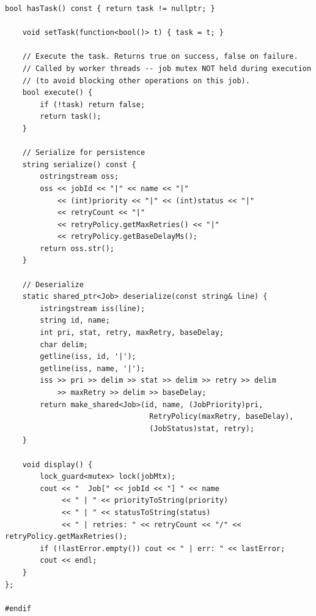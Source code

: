 \documentclass[11pt,a4paper]{article}
\begin{document}
\begin{lstlisting}[title={\texttt{models.hpp}}]
    bool hasTask() const { return task != nullptr; }

    void setTask(function<bool()> t) { task = t; }

    // Execute the task. Returns true on success, false on failure.
    // Called by worker threads -- job mutex NOT held during execution
    // (to avoid blocking other operations on this job).
    bool execute() {
        if (!task) return false;
        return task();
    }

    // Serialize for persistence
    string serialize() const {
        ostringstream oss;
        oss << jobId << "|" << name << "|"
            << (int)priority << "|" << (int)status << "|"
            << retryCount << "|"
            << retryPolicy.getMaxRetries() << "|"
            << retryPolicy.getBaseDelayMs();
        return oss.str();
    }

    // Deserialize
    static shared_ptr<Job> deserialize(const string& line) {
        istringstream iss(line);
        string id, name;
        int pri, stat, retry, maxRetry, baseDelay;
        char delim;
        getline(iss, id, '|');
        getline(iss, name, '|');
        iss >> pri >> delim >> stat >> delim >> retry >> delim
            >> maxRetry >> delim >> baseDelay;
        return make_shared<Job>(id, name, (JobPriority)pri,
                                 RetryPolicy(maxRetry, baseDelay),
                                 (JobStatus)stat, retry);
    }

    void display() {
        lock_guard<mutex> lock(jobMtx);
        cout << "  Job[" << jobId << "] " << name
             << " | " << priorityToString(priority)
             << " | " << statusToString(status)
             << " | retries: " << retryCount << "/" << retryPolicy.getMaxRetries();
        if (!lastError.empty()) cout << " | err: " << lastError;
        cout << endl;
    }
};

#endif
\end{lstlisting}

\newpage
\end{document}
